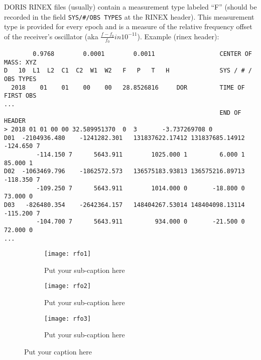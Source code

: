 DORIS RINEX files (usually) contain a measurement type labeled ``F'' (should be 
recorded in the field \verb|SYS/#/OBS TYPES| at the RINEX header). This measurement 
type is provided for every epoch and is a measure of the relative frequency 
offset of the receiver's oscillator (aka \(\frac{f-f_0}{f_0} in 10^{-11}\)).
Example (rinex header):
\begin{verbatim}
        0.9768        0.0001        0.0011                  CENTER OF MASS: XYZ
D   10  L1  L2  C1  C2  W1  W2   F   P   T   H              SYS / # / OBS TYPES
  2018    01    01    00    00   28.8526816     DOR         TIME OF FIRST OBS
...
                                                            END OF HEADER
> 2018 01 01 00 00 32.589951370  0  3       -3.737269708 0
D01  -2104936.480    -1241282.301   131837622.17412 131837685.14912      -124.650 7
         -114.150 7      5643.911        1025.000 1         6.000 1        85.000 1
D02  -1063469.796    -1862572.573   136575183.93813 136575216.89713      -118.350 7
         -109.250 7      5643.911        1014.000 0       -18.800 0        73.000 0
D03   -826480.354    -2642364.157   148404267.53014 148404098.13114      -115.200 7
         -104.700 7      5643.911         934.000 0       -21.500 0        72.000 0
...                                                            
\end{verbatim}

\begin{figure}
\begin{subfigure}{0.9\textwidth}
  \centering
  \texttt{[image: rfo1]}  
  \caption{Put your sub-caption here}
  \label{fig:sub-first}
\end{subfigure}
\begin{subfigure}{0.9\textwidth}
  \centering
  \texttt{[image: rfo2]}  
  \caption{Put your sub-caption here}
  \label{fig:sub-first}
\end{subfigure}
\begin{subfigure}{0.9\textwidth}
  \centering
  \texttt{[image: rfo3]}  
  \caption{Put your sub-caption here}
  \label{fig:sub-first}
\end{subfigure}
\caption{Put your caption here}
\label{fig:onw-week-rfo}
\end{figure}